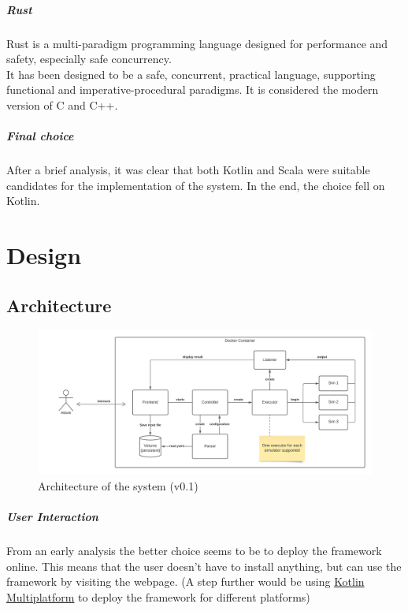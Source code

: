 \documentclass[12pt,a4paper,openright,twoside]{book}
\begin{document}
\paragraph*{Rust}

Rust is a multi-paradigm programming language designed for performance and safety, especially safe concurrency. \\
It has been designed to be a safe, concurrent, practical language, supporting functional and imperative-procedural paradigms.
It is considered the modern version of C and C++.

\paragraph*{Final choice}
After a brief analysis, it was clear that both Kotlin and Scala were suitable candidates for the implementation of the system.
In the end, the choice fell on Kotlin.

\chapter{Design}

\section{Architecture}

\begin{figure}[h]
    \centering
    \includegraphics[width=\textwidth]{figures/architecture.png}
    \caption{Architecture of the system (v0.1)}
    \label{fig:random-image}
\end{figure}

\paragraph*{User Interaction} From an early analysis the better choice seems to be to deploy the framework online.
This means that the user doesn't have to install anything, but can use the framework by visiting the webpage.
(A step further would be using \href{https://kotlinlang.org/docs/multiplatform.html#kotlin-multiplatform-use-cases}{Kotlin Multiplatform} to deploy the framework for different platforms)
\end{document}

